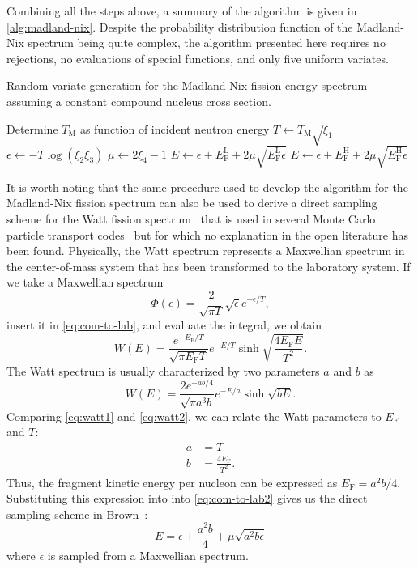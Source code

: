 \documentclass[3p,fleqn]{elsarticle}
\newcommand{\tmax}{T_{\mathrm{M}}}
\newcommand{\ef}{E_{\mathrm{F}}}
\newcommand{\efl}{E_{\mathrm{F}}^{\mathrm{L}}}
\newcommand{\efh}{E_{\mathrm{F}}^{\mathrm{H}}}
\begin{document}
Combining all the steps above, a summary of the algorithm is given in
\autoref{alg:madland-nix}. Despite the probability distribution function of the
Madland-Nix spectrum being quite complex, the algorithm presented here requires
no rejections, no evaluations of special functions, and only five uniform
variates.
\begin{algorithm}
  \caption{Random variate generation for the Madland-Nix fission energy spectrum
    assuming a constant compound nucleus cross section.}
  \label{alg:madland-nix}
  \begin{algorithmic}[1]
    \State Determine $\tmax$ as function of incident neutron energy
    \State $T \gets \tmax \sqrt{\xi_1}$
    \State $\epsilon \gets - T \log(\xi_2 \xi_3)$
    \State $\mu \gets 2\xi_4 - 1$
      \State $E \gets \epsilon + \efl + 2\mu \sqrt{\efl \epsilon}$
    \Else
      \State $E \gets \epsilon + \efh + 2\mu \sqrt{\efh \epsilon}$
    \EndIf
  \end{algorithmic}
\end{algorithm}

It is worth noting that the same procedure used to develop the algorithm for the
Madland-Nix fission spectrum can also be used to derive a direct sampling scheme
for the Watt fission spectrum~\cite{lanl-brown-2005} that is used in several
Monte Carlo particle transport codes~\cite{snamc-griesheimer-2013,
  ane-romano-2013} but for which no explanation in the open literature has been
found. Physically, the Watt spectrum represents a Maxwellian spectrum in the
center-of-mass system that has been transformed to the laboratory system. If we
take a Maxwellian spectrum
\begin{equation*}
  \Phi(\epsilon) = \frac{2}{\sqrt{\pi T}} \sqrt{\epsilon} e^{-\epsilon/T},
\end{equation*}
insert it in \autoref{eq:com-to-lab}, and evaluate the integral, we obtain
\begin{equation}
  W(E) = \frac{e^{-\ef/T}}{\sqrt{\pi \ef T}} e^{-E/T} \sinh \sqrt{\frac{4\ef
      E}{T^2}}.
  \label{eq:watt1}
\end{equation}
The Watt spectrum is usually characterized by two parameters $a$ and $b$ as
\begin{equation}
  W(E) = \frac{2e^{-ab/4}}{\sqrt{\pi a^3 b}} e^{-E/a} \sinh \sqrt{bE}.
  \label{eq:watt2}
\end{equation}
Comparing \autoref{eq:watt1} and \autoref{eq:watt2}, we can relate the Watt
parameters to $\ef$ and $T$:
\begin{align*}
  a &= T \\
  b &= \frac{4\ef}{T^2}.
\end{align*}
Thus, the fragment kinetic energy per nucleon can be expressed as $\ef =
a^2b/4$. Substituting this expression into into \autoref{eq:com-to-lab2} gives us
the direct sampling scheme in Brown~\cite{lanl-brown-2005}:
\begin{equation*}
  E = \epsilon + \frac{a^2b}{4} + \mu \sqrt{a^2 b \epsilon}
\end{equation*}
where $\epsilon$ is sampled from a Maxwellian spectrum.
\end{document}
